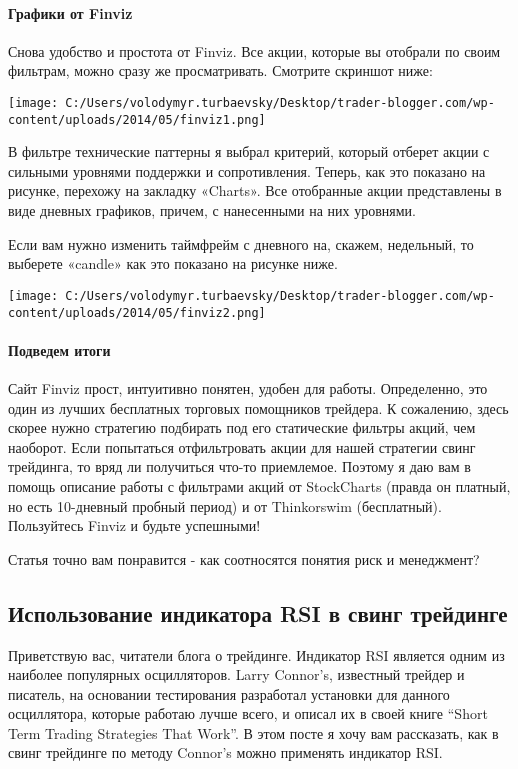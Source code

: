 \documentclass[a5paper]{article}
\begin{document}
\paragraph{Графики от Finviz}

Снова удобство и простота от Finviz. Все акции, которые вы отобрали по
своим фильтрам, можно сразу же просматривать. Смотрите скриншот ниже:

\texttt{[image: C:/Users/volodymyr.turbaevsky/Desktop/trader-blogger.com/wp-content/uploads/2014/05/finviz1.png]}


В фильтре технические паттерны я выбрал критерий, который отберет акции с сильными уровнями поддержки и сопротивления. Теперь, как это показано на рисунке, перехожу на закладку «Charts». Все отобранные акции представлены в виде дневных графиков, причем, с нанесенными на них уровнями.

Если вам нужно изменить таймфрейм с дневного на, скажем, недельный, то
выберете «candle» как это показано на рисунке ниже.

\texttt{[image: C:/Users/volodymyr.turbaevsky/Desktop/trader-blogger.com/wp-content/uploads/2014/05/finviz2.png]}

\paragraph{Подведем итоги}

Сайт Finviz прост, интуитивно понятен, удобен для работы. Определенно, это один из лучших бесплатных торговых помощников трейдера. К сожалению, здесь скорее нужно стратегию подбирать под его статические фильтры акций, чем наоборот. Если попытаться отфильтровать акции для нашей стратегии свинг трейдинга, то вряд ли получиться что-то приемлемое. Поэтому я даю вам в помощь описание работы с фильтрами акций от StockCharts (правда он платный, но есть 10-дневный пробный период) и от Thinkorswim (бесплатный). Пользуйтесь Finviz и будьте успешными!


Статья точно вам понравится - как соотносятся понятия риск и
менеджмент?

\subsection{Использование индикатора RSI в свинг трейдинге}

Приветствую вас, читатели блога о трейдинге. Индикатор RSI является одним из наиболее популярных осцилляторов. Larry Connor’s, известный трейдер и писатель, на основании тестирования разработал установки для данного осциллятора, которые работаю лучше всего, и описал их в своей книге “Short Term Trading Strategies That Work”. В этом посте я хочу вам рассказать, как в свинг трейдинге по методу Connor’s можно применять индикатор RSI.
\end{document}
